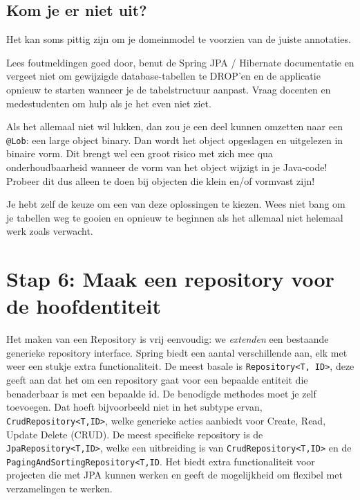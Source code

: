 \documentclass[dutch,a4paper,12pt,doubleside]{book}
\begin{document}
\subsection{Kom je er niet uit?}
Het kan soms pittig zijn om je domeinmodel te voorzien van de juiste annotaties.

Lees foutmeldingen goed door, benut de Spring JPA / Hibernate documentatie en vergeet niet om 
gewijzigde database-tabellen te DROP'en en de applicatie opnieuw te starten
wanneer je de tabelstructuur aanpast. Vraag docenten en medestudenten om hulp
als je het even niet ziet.

Als het allemaal niet wil lukken, dan zou je een deel kunnen omzetten naar een \texttt{@Lob}:
een large object binary. Dan wordt het object opgeslagen en uitgelezen 
in binaire vorm. Dit brengt wel een groot risico met zich mee qua onderhoudbaarheid
wanneer de vorm van het object wijzigt in je Java-code!
Probeer dit dus alleen te doen bij objecten die klein en/of vormvast zijn!

Je hebt zelf de keuze om een van deze oplossingen te kiezen.
Wees niet bang om je tabellen weg te gooien en opnieuw te beginnen als
het allemaal niet helemaal werk zoals verwacht.

\section{Stap 6: Maak een repository voor de hoofdentiteit}
Het maken van een Repository is vrij eenvoudig: we \textit{extenden} een bestaande 
generieke repository interface. Spring biedt een aantal verschillende aan, elk met 
weer een stukje extra functionaliteit. De meest basale is \texttt{Repository<T, ID>},
deze geeft aan dat het om een repository gaat voor een bepaalde entiteit die benaderbaar is 
met een bepaalde id. De benodigde methodes moet je zelf toevoegen. Dat hoeft bijvoorbeeld niet 
in het subtype ervan, \texttt{CrudRepository<T,ID>}, welke generieke acties aanbiedt voor
Create, Read, Update Delete (CRUD). De meest specifieke repository is de \texttt{JpaRepository<T,ID>},
welke een uitbreiding is van \texttt{CrudRepository<T,ID>} en de \texttt{PagingAndSortingRepository<T,ID}.
Het biedt extra functionaliteit voor projecten die met JPA kunnen werken
en geeft de mogelijkheid om flexibel met verzamelingen te werken.
\end{document}
